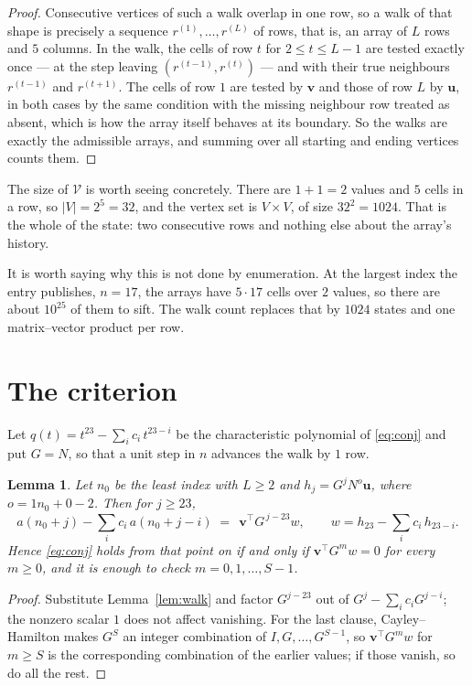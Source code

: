 \documentclass[11pt,a4paper]{article}
\theoremstyle{plain}
\newtheorem{lemma}[theorem]{Lemma}
\theoremstyle{definition}
\begin{document}
\begin{proof}
Consecutive vertices of such a walk overlap in one row, so a walk of that shape is
precisely a sequence $r^{(1)},\dots,r^{(L)}$ of rows, that is, an array of $L$ rows
and $5$ columns. In the walk, the cells of row $t$ for $2\le t\le L-1$ are tested
exactly once --- at the step leaving $(r^{(t-1)},r^{(t)})$ --- and with their true
neighbours $r^{(t-1)}$ and $r^{(t+1)}$. The cells of row $1$ are tested by
$\mathbf{v}$ and those of row $L$ by $\mathbf{u}$, in both cases by the same condition
with the missing neighbour row treated as absent, which is how the array itself behaves at
its boundary. So the walks are exactly the admissible arrays, and summing over all starting
and ending vertices counts them.
\end{proof}


The size of $\mathcal V$ is worth seeing concretely. There are $1+1=2$ values
and $5$ cells in a row, so $|V|=2^{5}=32$, and the vertex set is
$V\times V$, of size $32^2=1024$. That is the whole of the state: two consecutive
rows and nothing else about the array's history.

It is worth saying why this is not done by enumeration. At the largest index the entry
publishes, $n=17$, the arrays have $5\cdot17$ cells over
$2$ values, so there are about $10^{25}$ of them to sift. The
walk count replaces that by $1024$ states and one matrix--vector product per row.
\section{The criterion}

Let $q(t)=t^{23}-\sum_i c_i\,t^{23-i}$ be the characteristic polynomial of
\eqref{eq:conj} and put $G=N$, so that a unit step in $n$ advances the walk by
$1$ row.

\begin{lemma}\label{lem:crit}
Let $n_0$ be the least index with $L\ge2$ and $h_j=G^{j}N^{o}\mathbf{u}$, where
$o=1n_0+0-2$. Then for $j\ge23$,
\[
a(n_0+j)-\sum_i c_i\,a(n_0+j-i)\;=\;\,\mathbf{v}^{\!\top}G^{\,j-23}w,
\qquad w=h_{23}-\sum_i c_i\,h_{23-i} .
\]
Hence \eqref{eq:conj} holds from that point on if and only if
$\mathbf{v}^{\!\top}G^{m}w=0$ for every $m\ge0$, and it is enough to check
$m=0,1,\dots,S-1$.
\end{lemma}

\begin{proof}
Substitute Lemma~\ref{lem:walk} and factor $G^{j-23}$ out of
$G^{j}-\sum_ic_iG^{j-i}$; the nonzero scalar $1$ does not affect
vanishing. For the last clause, Cayley--Hamilton makes $G^{S}$ an integer combination of
$I,G,\dots,G^{S-1}$, so $\mathbf{v}^{\!\top}G^{m}w$ for $m\ge S$ is the corresponding
combination of the earlier values; if those vanish, so do all the rest.
\end{proof}
\end{document}
